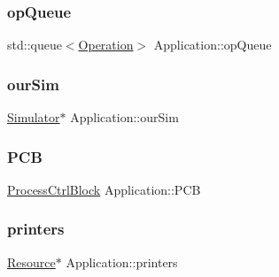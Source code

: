 \hypertarget{class_application_a5b4ee9982980b3800888d69c06495695}{}\label{class_application_a5b4ee9982980b3800888d69c06495695} 
\subsubsection{\texorpdfstring{op\+Queue}{opQueue}}
{\footnotesize\ttfamily std\+::queue$<$\hyperlink{struct_operation}{Operation}$>$ Application\+::op\+Queue}

\hypertarget{class_application_acde9fbff36a1944448c5c7a4f955ed60}{}\label{class_application_acde9fbff36a1944448c5c7a4f955ed60} 
\subsubsection{\texorpdfstring{our\+Sim}{ourSim}}
{\footnotesize\ttfamily \hyperlink{class_simulator}{Simulator}$\ast$ Application\+::our\+Sim\hspace{0.3cm}{\ttfamily [private]}}

\hypertarget{class_application_a70949b46aa0b4fd18ef9f0eb5ae3ff29}{}\label{class_application_a70949b46aa0b4fd18ef9f0eb5ae3ff29} 
\subsubsection{\texorpdfstring{P\+CB}{PCB}}
{\footnotesize\ttfamily \hyperlink{struct_process_ctrl_block}{Process\+Ctrl\+Block} Application\+::\+P\+CB}

\hypertarget{class_application_ad36f40feace83b72030e43a91a67fdd7}{}\label{class_application_ad36f40feace83b72030e43a91a67fdd7} 
\subsubsection{\texorpdfstring{printers}{printers}}
{\footnotesize\ttfamily \hyperlink{class_resource}{Resource}$\ast$ Application\+::printers\hspace{0.3cm}{\ttfamily [private]}}

\hypertarget{class_application_aefd0ae255459653db9ccf40ce8d71db2}{}\label{class_application_aefd0ae255459653db9ccf40ce8d71db2} 
